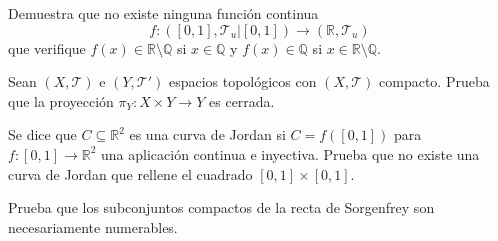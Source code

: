\begin{ejercicio}
Demuestra que no existe ninguna función continua \[f: ([0, 1], \mathcal{T}_u|[0,1]) \to (\mathbb{R}, \mathcal{T}_u)\] que verifique \(f(x) \in \mathbb{R} \setminus \mathbb{Q}\) si \(x \in \mathbb{Q}\) y \(f(x) \in \mathbb{Q}\) si \(x \in \mathbb{R} \setminus \mathbb{Q}\).
\end{ejercicio}

\begin{ejercicio}
Sean \((X, \mathcal{T})\) e \((Y, \mathcal{T'})\) espacios topológicos con \((X, \mathcal{T})\) compacto. Prueba que la proyección \(\pi_Y: X \times Y \to Y\) es cerrada.
\end{ejercicio}

\begin{ejercicio}
Se dice que \(C \subseteq \mathbb{R}^2\) es una curva de Jordan si \(C = f([0, 1])\) para \(f: [0, 1] \to \mathbb{R}^2\) una aplicación continua e inyectiva. Prueba que no existe una curva de Jordan que rellene el cuadrado \([0, 1] \times [0, 1]\).
\end{ejercicio}


\begin{ejercicio}
    Prueba que los subconjuntos compactos de la recta de Sorgenfrey son necesariamente
numerables.
\end{ejercicio}